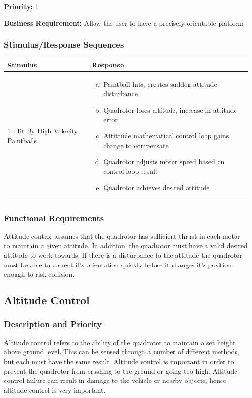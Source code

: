 \documentclass[english]{article}
\numberwithin{equation}{section} %
\begin{document}
\textbf{Priority:} 1

\textbf{Business Requirement:} Allow the user to have a precisely orientable platform

\subsubsection{Stimulus/Response Sequences}

\begin{longtable}{p{3cm} | p{8.5cm}}
\hline
\textbf{Stimulus} & \textbf{Response}\\
\hline
1. Hit By High Velocity Paintballs &
\begin{enumerate}[(a)]\itemsep1pt %
\item Paintball hits, creates sudden attitude disturbance
\item Quadrotor loses altitude, increase in attitude error
\item Attittude mathematical control loop gains change to compensate
\item Quadrotor adjusts motor speed based on control loop result
\item Quadrotor achieves desired attitude
\end{enumerate}
\\ 
\hline
\end{longtable}
\subsubsection{Functional Requirements}
Attitude control assumes that the quadrotor has sufficient thrust in each motor to maintain a given attitude. In addition, the quadrotor must have a valid desired attitude to work towards. If there is a disturbance to the attitude the quadrotor must be able to correct it's orientation quickly before it changes it's position enough to risk collision.
\bigskip
\subsection{Altitude Control}
\subsubsection{Description and Priority}
Altitude control refers to the ability of the quadrotor to maintain a set height above ground level. This can be sensed through a number of different methods, but each must have the same result. Altitude control is important in order to prevent the quadrotor from crashing to the ground or going too high. Altitude control failure can result in damage to the vehicle or nearby objects, hence altitude control is very important.
\end{document}
